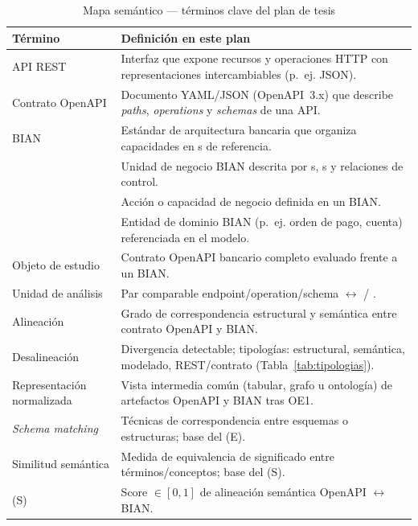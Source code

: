 \begin{table}[H]
  \centering
  \caption{Mapa semántico --- términos clave del plan de tesis}
  \label{tab:glosario}
  \small
  \begin{tabular}{@{}p{}p{}@{}}
    \toprule
    \textbf{Término} & \textbf{Definición en este plan} \\
    \midrule
    API REST &
    Interfaz que expone recursos y operaciones HTTP con representaciones intercambiables (p.\ ej. JSON). \\
    Contrato OpenAPI &
    Documento YAML/JSON (OpenAPI~3.x) que describe \textit{paths}, \textit{operations} y \textit{schemas} de una API. \\
    BIAN &
    Estándar de arquitectura bancaria que organiza capacidades en \ServiceDomain{}s de referencia. \\
    \ServiceDomain{} &
    Unidad de negocio BIAN descrita por \Behavior{}s, \BusinessObject{}s y relaciones de control. \\
    \Behavior{} &
    Acción o capacidad de negocio definida en un \ServiceDomain{} BIAN. \\
    \BusinessObject{} &
    Entidad de dominio BIAN (p.\ ej. orden de pago, cuenta) referenciada en el modelo. \\
    Objeto de estudio &
    Contrato OpenAPI bancario completo evaluado frente a un \ServiceDomain{} BIAN. \\
    Unidad de análisis &
    Par comparable endpoint/operation/schema $\leftrightarrow$ \Behavior{} / \BusinessObject{}. \\
    Alineación &
    Grado de correspondencia estructural y semántica entre contrato OpenAPI y \ServiceDomain{} BIAN. \\
    Desalineación &
    Divergencia detectable; tipologías: estructural, semántica, modelado, REST/contrato (Tabla~\ref{tab:tipologias}). \\
    Representación normalizada &
    Vista intermedia común (tabular, grafo u ontología) de artefactos OpenAPI y BIAN tras OE1. \\
    \textit{Schema matching} &
    Técnicas de correspondencia entre esquemas o estructuras; base del \StructuralScore{} (E). \\
    Similitud semántica &
    Medida de equivalencia de significado entre términos/conceptos; base del \SemanticScore{} (S). \\
    \SemanticScore{} (S) &
    Score $\in [0,1]$ de alineación semántica OpenAPI $\leftrightarrow$ BIAN. \\

\end{tabular}
\end{table}

